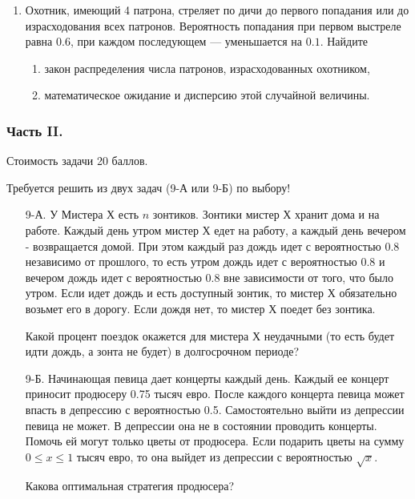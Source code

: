 \begin{enumerate}
\item Охотник, имеющий 4 патрона, стреляет по дичи до первого попадания или до
израсходования всех патронов. Вероятность попадания при первом выстреле равна $0.6$,
при каждом последующем — уменьшается на $0.1$. Найдите
\begin{enumerate}
\item закон распределения числа патронов, израсходованных охотником,
\item математическое ожидание и дисперсию этой случайной величины.
\end{enumerate}
\end{enumerate}

\subsubsection*{Часть II.}

Стоимость задачи 20 баллов.

Требуется решить \textbf{} из двух задач (9-А или 9-Б) по
выбору!

\begin{enumerate}
\item[9-А.] У Мистера Х есть $n$ зонтиков. Зонтики мистер Х хранит дома и на работе.
Каждый день утром мистер Х едет на работу, а каждый день вечером - возвращается домой.
При этом каждый раз дождь идет с вероятностью $0.8$ независимо от прошлого, то есть
утром дождь идет с вероятностью $0.8$ и вечером дождь идет с вероятностью $0.8$
вне зависимости от того, что было утром. Если идет дождь и есть доступный зонтик,
то мистер Х обязательно возьмет его в дорогу. Если дождя нет, то мистер Х поедет
без зонтика.

Какой процент поездок окажется для мистера Х неудачными (то есть будет идти дождь,
а зонта не будет) в долгосрочном периоде?

\item[9-Б.] Начинающая певица дает концерты каждый день. Каждый ее концерт приносит
продюсеру 0.75 тысяч евро. После каждого концерта певица может впасть в депрессию с
вероятностью 0.5. Самостоятельно выйти из депрессии певица не может. В депрессии она
не в состоянии проводить концерты. Помочь ей могут только цветы от продюсера. Если
подарить цветы на сумму $0\le x\le 1$ тысяч евро, то она выйдет из депрессии с
вероятностью $\sqrt{x}$.

Какова оптимальная стратегия продюсера?
\end{enumerate}


\newpage
